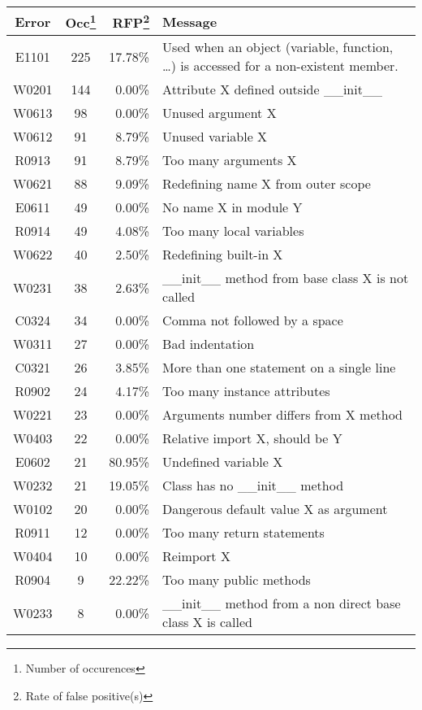 \documentclass[11pt, a4paper]{article}
\begin{document}
\begin{longtable}{|c|c|r|m{9.2cm}|}
\hline
\textbf{\small{Error}} & \textbf{\small{Occ\footnote{Number of occurences}}} & \textbf{\small{RFP\footnote{Rate of false positive(s)}}} & \textbf{\small{Message}} \\
\hline
\hline
E1101 & 225 & 17.78\% & Used when an object (variable, function, \dots) is accessed for a non-existent member. \\
\hline
W0201 & 144 & 0.00\% & Attribute X defined outside \_\_init\_\_ \\
\hline
W0613 & 98 & 0.00\% & Unused argument X \\
\hline
W0612 & 91 & 8.79\% & Unused variable X \\
\hline
R0913 & 91 & 8.79\% & Too many arguments X \\
\hline
W0621 & 88 & 9.09\% & Redefining name X from outer scope \\
\hline
E0611 & 49 & 0.00\% & No name X in module Y \\
\hline
R0914 & 49 & 4.08\% & Too many local variables \\
\hline
W0622 & 40 & 2.50\% & Redefining built-in X \\
\hline
W0231 & 38 & 2.63\% & \_\_init\_\_ method from base class X is not called \\
\hline
C0324 & 34 & 0.00\% & Comma not followed by a space \\
\hline
W0311 & 27 & 0.00\% & Bad indentation \\
\hline
C0321 & 26 & 3.85\% & More than one statement on a single line \\
\hline
R0902 & 24 & 4.17\% & Too many instance attributes \\
\hline
W0221 & 23 & 0.00\% & Arguments number differs from X method \\
\hline
W0403 & 22 & 0.00\% & Relative import X, should be Y \\
\hline
E0602 & 21 & 80.95\% & Undefined variable X \\
\hline
W0232 & 21 & 19.05\% & Class has no \_\_init\_\_ method \\
\hline
W0102 & 20 & 0.00\% & Dangerous default value X as argument \\
\hline
R0911 & 12 & 0.00\% & Too many return statements \\
\hline
W0404 & 10 & 0.00\% & Reimport X \\
\hline
R0904 & 9 & 22.22\% & Too many public methods \\
\hline
W0233 & 8 & 0.00\% & \_\_init\_\_ method from a non direct base class X is called \\

\end{longtable}
\end{document}
